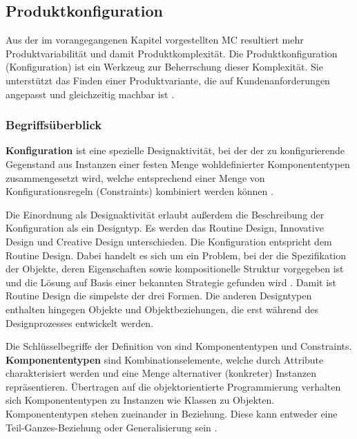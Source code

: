 \documentclass[12pt,a4paper,bibliography=totocnumbered,listof=totoc]{scrartcl}
\begin{document}
\pagebreak
\subsection{Produktkonfiguration}
\label{subssubsection:Produktkonfiguration}
 
Aus der im vorangegangenen Kapitel vorgestellten \ac{MC} resultiert mehr Produktvariabilität und damit Produktkomplexität. Die Produktkonfiguration (Konfiguration) ist ein Werkzeug zur Beherrschung dieser Komplexität. Sie unterstützt das Finden einer Produktvariante, die auf Kundenanforderungen angepasst und gleichzeitig machbar ist \citep{lutz11}.

\subsubsection{Begriffsüberblick}
\label{subsubsection:begriffsuberblick}
\textbf{Konfiguration} ist eine spezielle Designaktivität, bei der der zu konfigurierende Gegenstand aus Instanzen einer festen Menge wohldefinierter Komponententypen zusammengesetzt wird, welche entsprechend einer Menge von Konfigurationsregeln (Constraints) kombiniert werden können \citep{sabin98}.

Die Einordnung als Designaktivität erlaubt außerdem die Beschreibung der Konfiguration als ein Designtyp. Es werden das \glqq Routine Design\grqq{}, \glqq Innovative Design\grqq{} und \glqq Creative Design\grqq{} unterschieden. Die Konfiguration entspricht dem \glqq Routine Design\grqq{}. Dabei handelt es sich um ein Problem, bei der die Spezifikation der Objekte, deren Eigenschaften sowie kompositionelle Struktur vorgegeben ist und die Lösung auf Basis einer bekannten Strategie gefunden wird \citep{brown89}. Damit ist \glqq Routine Design\grqq{} die simpelste der drei Formen. Die anderen Designtypen enthalten hingegen Objekte und Objektbeziehungen, die erst während des Designprozesses entwickelt werden.

Die Schlüsselbegriffe der Definition von \citeauthor{sabin98} sind Komponententypen und Constraints. \textbf{Komponententypen} sind Kombinationselemente, welche durch Attribute charakterisiert werden und eine Menge alternativer (konkreter) Instanzen repräsentieren. Übertragen auf die objektorientierte Programmierung verhalten sich Komponententypen zu Instanzen wie Klassen zu Objekten. Komponententypen stehen zueinander in Beziehung. Diese kann entweder eine \glqq Teil-Ganzes\grqq{}-Beziehung oder Generalisierung sein \citep{felferning14}. 
\end{document}
